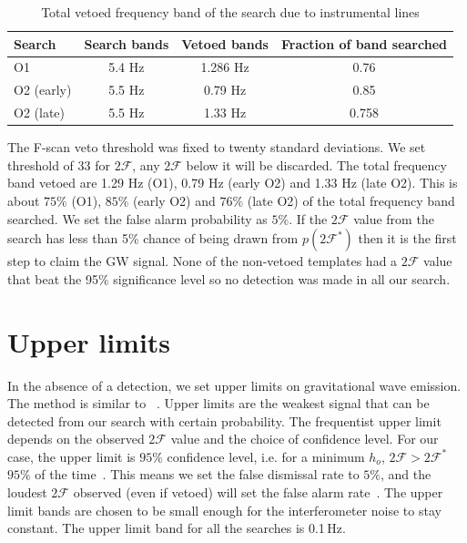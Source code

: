 \documentclass{ttuthes2007}
\begin{document}
\begin{table} 
\centering
\begin{tabular}{lccc} 
\hline
\hline
\textrm{Search} & \textrm{Search bands} & \textrm{Vetoed bands} &
\textrm{Fraction of band searched}\\[5pt]   
\hline
\ac{O1} & 5.4 Hz & 1.286 Hz & 0.76\\[5pt] 
\ac{O2} (early)& 5.5 Hz  & 0.79 Hz & 0.85\\[5pt] 
\ac{O2} (late) & 5.5 Hz & 1.33 Hz & 0.758\\  
\hline
\hline
\end{tabular} 
\caption{Total vetoed frequency band of the search due to instrumental
lines}\label{table:veto} 
\end{table} 
 
The F-scan veto threshold was fixed to twenty standard
deviations.  We set threshold of 33 for $2\mathcal{F}$, any $2\mathcal{F}$ below
it will be discarded.  The total frequency band vetoed are 1.29 Hz (O1), 0.79 Hz
(early O2) and 1.33 Hz (late O2). This is about $75\%$ (O1), $85\%$ (early O2)
and $76\%$ (late O2) of the total frequency band searched. We set the false
alarm probability as $5\%$. If the $2\mathcal{F}$
value from the search has less than 5\% chance of being drawn from
$p(2\mathcal{F}^*)$ then it is the first step to claim the \ac{GW} signal. None
of the non-vetoed templates had a $2\mathcal{F}$ value that beat the 95\%
significance level so no detection was made in all our search.

\section{Upper limits}
In the absence of a detection, we set upper limits on gravitational wave
emission. The method is similar to ~\citet{Lindblom_2020}. Upper limits are the
weakest signal that can be detected from our search with certain probability.
The frequentist upper limit depends on the observed $2\mathcal{F}$ value and the
choice of confidence level. For our case, the upper limit is $95\%$ confidence
level, i.e. for a minimum $h_o$, $2\mathcal{F} > 2\mathcal{F}^*$ $95\%$ of the
time~\cite{Romano_2017}. This means we set the false dismissal rate to $5\%$,
and the loudest $2\mathcal{F}$ observed (even if vetoed) will set the false alarm
rate~\cite{Aasi_2015}. The upper limit bands are chosen to be small enough for
the interferometer noise to stay constant. The upper limit band for all the
searches is 0.1\,Hz. 
\end{document}
